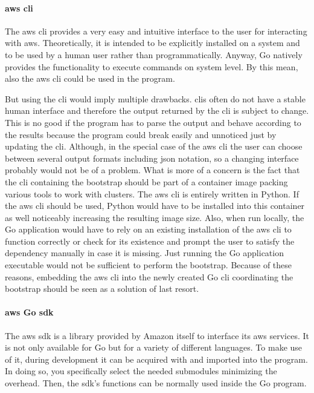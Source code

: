 \paragraph{\ac{aws} \ac{cli}}
The \ac{aws} \ac{cli} provides a very easy and intuitive interface to the user for interacting with \ac{aws}.
Theoretically, it is intended to be explicitly installed on a system and to be used by a human user rather than programmatically.
Anyway, Go natively provides the functionality to execute commands on system level.
By this mean, also the \ac{aws} \ac{cli} could be used in the program.

But using the \ac{cli} would imply multiple drawbacks.
\acp{cli} often do not have a stable human interface and therefore the output returned by the \ac{cli} is subject to change.
This is no good if the program has to parse the output and behave according to the results because the program could break easily and unnoticed just by updating the \ac{cli}.
Although, in the special case of the \ac{aws} \ac{cli} the user can choose between several output formats including \ac{json} notation, so a changing interface probably would not be of a problem.
What is more of a concern is the fact that the \ac{cli} containing the bootstrap should be part of a container image packing various tools to work with clusters.
The \ac{aws} \ac{cli} is entirely written in Python.
If the \ac{aws} \ac{cli} should be used, Python would have to be installed into this container as well noticeably increasing the resulting image size.
Also, when run locally, the Go application would have to rely on an existing installation of the \ac{aws} \ac{cli} to function correctly or check for its existence and prompt the user to satisfy the dependency manually in case it is missing.
Just running the Go application executable would not be sufficient to perform the bootstrap.
Because of these reasons, embedding the \ac{aws} \ac{cli} into the newly created Go \ac{cli} coordinating the bootstrap should be seen as a solution of last resort.

\paragraph{\ac{aws} Go \acs*{sdk}}
The \ac{aws} \ac{sdk} is a library provided by Amazon itself to interface its \ac{aws} services.
It is not only available for Go but for a variety of different languages.
To make use of it, during development it can be acquired with  and imported into the program.
In doing so, you specifically select the needed submodules minimizing the overhead.
Then, the \ac{sdk}'s functions can be normally used inside the Go program.

